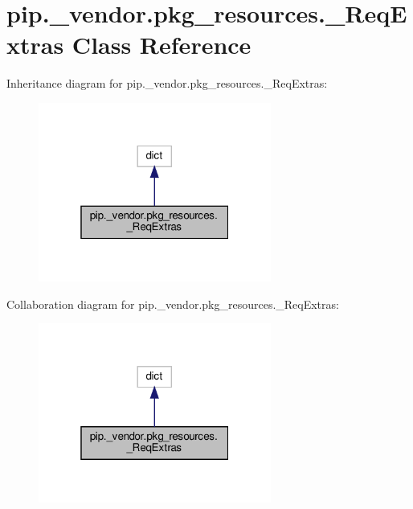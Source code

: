 \hypertarget{classpip_1_1__vendor_1_1pkg__resources_1_1__ReqExtras}{}\section{pip.\+\_\+vendor.\+pkg\+\_\+resources.\+\_\+\+Req\+Extras Class Reference}
\label{classpip_1_1__vendor_1_1pkg__resources_1_1__ReqExtras}


Inheritance diagram for pip.\+\_\+vendor.\+pkg\+\_\+resources.\+\_\+\+Req\+Extras\+:
\nopagebreak
\begin{figure}[H]
\begin{center}
\leavevmode
\includegraphics[width=217pt]{classpip_1_1__vendor_1_1pkg__resources_1_1__ReqExtras__inherit__graph}
\end{center}
\end{figure}


Collaboration diagram for pip.\+\_\+vendor.\+pkg\+\_\+resources.\+\_\+\+Req\+Extras\+:
\nopagebreak
\begin{figure}[H]
\begin{center}
\leavevmode
\includegraphics[width=217pt]{classpip_1_1__vendor_1_1pkg__resources_1_1__ReqExtras__coll__graph}
\end{center}
\end{figure}
